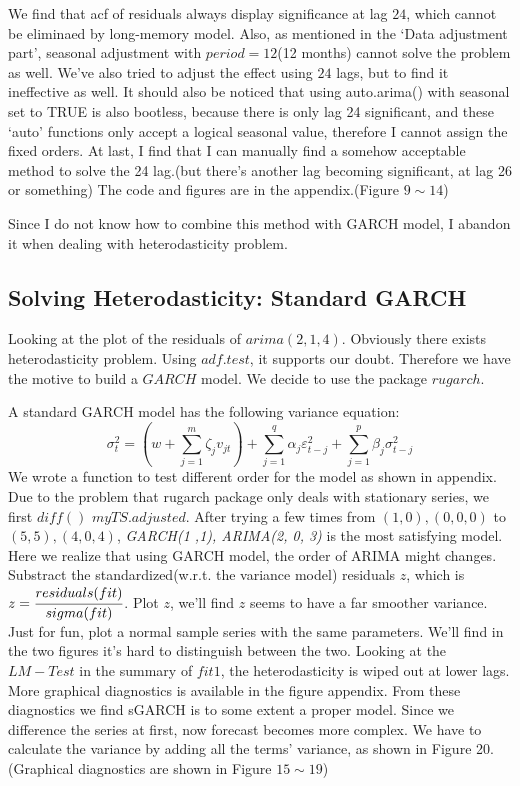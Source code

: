 \documentclass[a4paper,11pt]{article}
\begin{document}
We find that acf of residuals always display significance at lag $24$, which cannot be eliminaed by long-memory model. Also, as mentioned in the `Data adjustment part', seasonal adjustment with $period = 12$(12 months) cannot solve the problem as well. We've also tried to adjust the effect using $24$ lags, but to find it ineffective as well. It should also be noticed that using auto.arima() with seasonal set to TRUE is also bootless, because there is only lag 24 significant, and these `auto' functions only accept a logical seasonal value, therefore I cannot assign the fixed orders. At last, I find that I can manually find a somehow acceptable method to solve the 24 lag.(but there's another lag becoming significant, at lag 26 or something) The code and figures are in the appendix.(Figure $9 \sim 14$)\par
Since I do not know how to combine this method with GARCH model, I abandon it when dealing with heterodasticity problem. 

\subsection{Solving Heterodasticity: Standard GARCH}
Looking at the plot of the residuals of $arima(2, 1, 4)$. Obviously there exists heterodasticity problem. Using $adf.test$, it supports our doubt. Therefore we have the motive to build a $GARCH$ model. We decide to use the package $rugarch$.\par
A standard GARCH model has the following variance equation:
\begin{equation*}
	\sigma_t^2 = (w + \sum_{j = 1}^m \zeta_j v_{jt}) + \sum_{j = 1}^q \alpha_j \varepsilon_{t-j}^2 + \sum_{j = 1}^p \beta_j \sigma_{t-j}^2
\end{equation*} 
\indent We wrote a function to test different order for the model as shown in appendix. Due to the problem that rugarch package only deals with stationary series, we first $diff()$ $myTS.adjusted$. After trying a few times from $(1, 0), (0, 0, 0)$ to $(5, 5), (4, 0, 4)$, \textit{GARCH(1 ,1), ARIMA(2, 0, 3)} is the most satisfying model. Here we realize that using GARCH model, the order of ARIMA might changes. 
\indent Substract the standardized(w.r.t. the variance model) residuals $z$, which is $z = \cfrac{residuals(fit)}{sigma(fit)}$. Plot $z$, we'll find $z$ seems to have a far smoother variance. Just for fun, plot a normal sample series with the same parameters. We'll find in the two figures it's hard to distinguish between the two. Looking at the $LM-Test$ in the summary of $fit 1$, the heterodasticity is wiped out at lower lags.  More graphical diagnostics is available in the figure appendix. From these diagnostics we find sGARCH is to some extent a proper model.
\indent Since we difference the series at first, now forecast becomes more complex. We have to calculate the variance by adding all the terms' variance, as shown in Figure 20.
(Graphical diagnostics are shown in Figure $15 \sim 19$)
\end{document}

